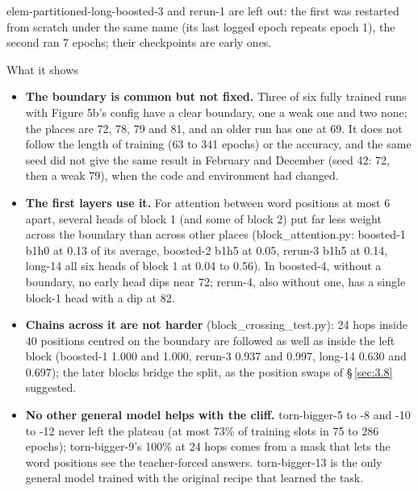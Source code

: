 \documentclass[paper=a4,fontsize=11pt,DIV=11,parskip=half,headings=small,numbers=noendperiod]{scrartcl}
\DeclareRobustCommand{\lead}[1]{\textsf{\bfseries\color{accent}#1}}
\DeclareRobustCommand{\code}[1]{{\fontseries{m}\ttfamily #1}}
\begin{document}
\code{elem-\allowbreak{}partitioned-\allowbreak{}long-\allowbreak{}boosted-\allowbreak{}3} and
\code{rerun-\allowbreak{}1} are left out: the first was restarted from scratch under the same name (its last
logged epoch repeats epoch 1), the second ran 7 epochs; their checkpoints are early ones.

\begin{findbox}{What it shows}
\begin{itemize}
\item \lead{The boundary is common but not fixed.} Three of six fully trained runs with Figure 5b’s config have
  a clear boundary, one a weak one and two none; the places are 72, 78, 79 and 81, and an older run has one at
  69. It does not follow the length of training (63 to 341 epochs) or the accuracy, and the same seed did not
  give the same result in February and December (seed 42: 72, then a weak 79), when the code and environment had
  changed.
\item \lead{The first layers use it.} For attention between word positions at most 6 apart, several heads of
  block 1 (and some of block 2) put far less weight across the boundary than across other places
  (\code{block\_\allowbreak{}attention.\allowbreak{}py}: \code{boosted-\allowbreak{}1} b1h0 at 0.13 of its
  average, \code{boosted-\allowbreak{}2} b1h5 at 0.05, \code{rerun-\allowbreak{}3} b1h5 at 0.14,
  \code{long-\allowbreak{}14} all six heads of block 1 at 0.04 to 0.56). In \code{boosted-\allowbreak{}4},
  without a boundary, no early head dips near 72; \code{rerun-\allowbreak{}4}, also without one, has a single
  block-1 head with a dip at 82.
\item \lead{Chains across it are not harder}
  (\code{block\_\allowbreak{}crossing\_\allowbreak{}test.\allowbreak{}py}): 24 hops inside 40 positions centred
  on the boundary are followed as well as inside the left block (\code{boosted-\allowbreak{}1} 1.000 and 1.000,
  \code{rerun-\allowbreak{}3} 0.937 and 0.997, \code{long-\allowbreak{}14} 0.630 and 0.697); the later blocks
  bridge the split, as the position swaps of \S\,\ref{sec:3.8} suggested.
\item \lead{No other general model helps with the cliff.} \code{torn-\allowbreak{}bigger-\allowbreak{}5} to
  \code{-\allowbreak{}8} and \code{-\allowbreak{}10} to \code{-\allowbreak{}12} never left the plateau (at most
  73\% of training slots in 75 to 286 epochs); \code{torn-\allowbreak{}bigger-\allowbreak{}9}’s 100\% at 24 hops
  comes from a mask that lets the word positions see the teacher-forced answers.
  \code{torn-\allowbreak{}bigger-\allowbreak{}13} is the only general model trained with the original recipe
  that learned the task.
\end{itemize}
\end{findbox}
\end{document}
